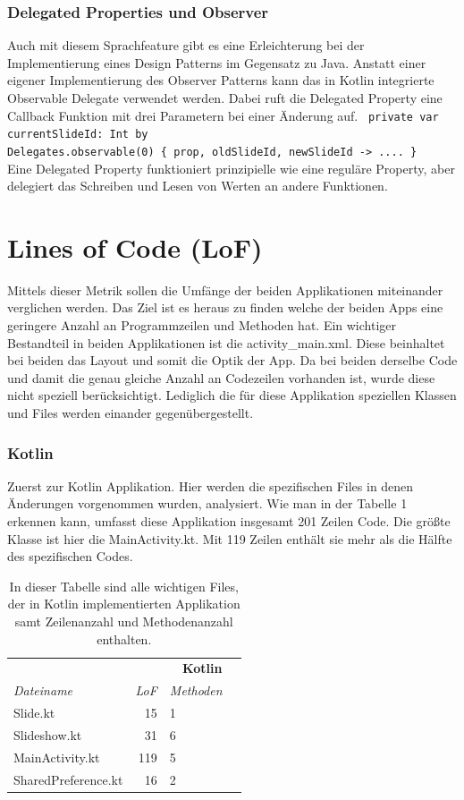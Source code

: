 \documentclass{sigchi-ext}
\begin{document}
\subsubsection{Delegated Properties und Observer}
Auch mit diesem Sprachfeature gibt es eine Erleichterung bei der Implementierung eines Design Patterns im Gegensatz zu Java. Anstatt einer eigener Implementierung des Observer Patterns kann das in Kotlin integrierte Observable Delegate verwendet werden. Dabei ruft die Delegated Property eine Callback Funktion mit drei Parametern bei einer Änderung auf. \ \texttt{private var currentSlideId: Int by \\Delegates.observable(0) \{ prop, oldSlideId, newSlideId -> .... \}} \\ Eine Delegated Property funktioniert prinzipielle wie eine reguläre Property, aber delegiert das Schreiben und Lesen von Werten an andere Funktionen. \cite{delegates}

\section{Lines of Code (LoF)}
Mittels dieser Metrik sollen die Umfänge der beiden Applikationen miteinander verglichen werden. Das Ziel ist es heraus zu finden welche der beiden Apps eine geringere Anzahl an Programmzeilen und Methoden hat. 
Ein wichtiger Bestandteil in beiden Applikationen ist die activity\_main.xml. Diese beinhaltet bei beiden das Layout und somit die Optik der App. Da bei beiden derselbe Code und damit die genau gleiche Anzahl an 
Codezeilen vorhanden ist, wurde diese nicht speziell berücksichtigt. Lediglich die für diese Applikation speziellen Klassen und Files werden einander gegenübergestellt.

\subsubsection{Kotlin}
Zuerst zur Kotlin Applikation. Hier werden die spezifischen Files in denen Änderungen vorgenommen wurden, analysiert. Wie man in der Tabelle 1 erkennen kann, umfasst diese Applikation insgesamt 201 Zeilen Code. Die größte Klasse ist hier die MainActivity.kt. Mit 119 Zeilen enthält sie mehr als die Hälfte des spezifischen Codes. 

\begin{table}
  \centering
  \begin{tabular}{l r l l}
    & & \multicolumn{2}{c}{\small{\textbf{Kotlin}}} \\
    \cmidrule(r){3-4}
    {\small\textit{Dateiname}}
    & {\small \textit{LoF}}
      & {\small \textit{Methoden}} \\
    \midrule
	Slide.kt & 15 & 1 \\
	Slideshow.kt & 31 & 6 \\
	MainActivity.kt & 119 & 5 \\
	SharedPreference.kt & 16 & 2\\
  \end{tabular}
  \caption{In dieser Tabelle sind alle wichtigen Files, der in Kotlin implementierten Applikation samt Zeilenanzahl und Methodenanzahl enthalten.}~\label{tab:table1}
\end{table}
\end{document}
